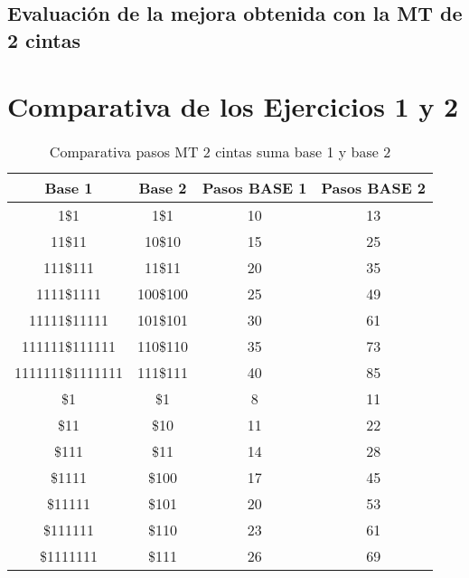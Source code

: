 \documentclass{uc3mpracticas}
\begin{document}
  \subsection{Evaluación de la mejora obtenida con la MT de 2 cintas}







  \clearpage

  \section{Comparativa de los Ejercicios 1 y 2}

  \begin{table}[!h]
    \centering
  \begin{tabular}{|c|c|c|c|}
  \hline
  \textbf{Base 1}   & \textbf{Base 2} & \textbf{Pasos BASE 1} & \textbf{Pasos BASE 2} \\ \hline
  1\$1     & 1\$1            & 10                    & 13                    \\ \hline
  11\$11   & 10\$10          & 15                    & 25                    \\ \hline
  111\$111 & 11\$11          & 20                    & 35                    \\ \hline
  1111\$1111        & 100\$100        & 25                    & 49                    \\ \hline
  11111\$11111      & 101\$101        & 30                    & 61                    \\ \hline
  111111\$111111    & 110\$110        & 35                    & 73                    \\ \hline
  1111111\$1111111  & 111\$111        & 40                    & 85                    \\ \hline
  \$1               & \$1             & 8                     & 11                    \\ \hline
  \$11              & \$10            & 11                    & 22                    \\ \hline
  \$111             & \$11            & 14                    & 28                    \\ \hline
  \$1111            & \$100           & 17                    & 45                    \\ \hline
  \$11111           & \$101           & 20                    & 53                    \\ \hline
  \$111111          & \$110           & 23                    & 61                    \\ \hline
  \$1111111         & \$111           & 26                    & 69                    \\ \hline
  \end{tabular}
  \caption{Comparativa pasos MT 2 cintas suma base 1 y base 2}
  \label{tab:comparativaSuma}
  \end{table}
\end{document}
